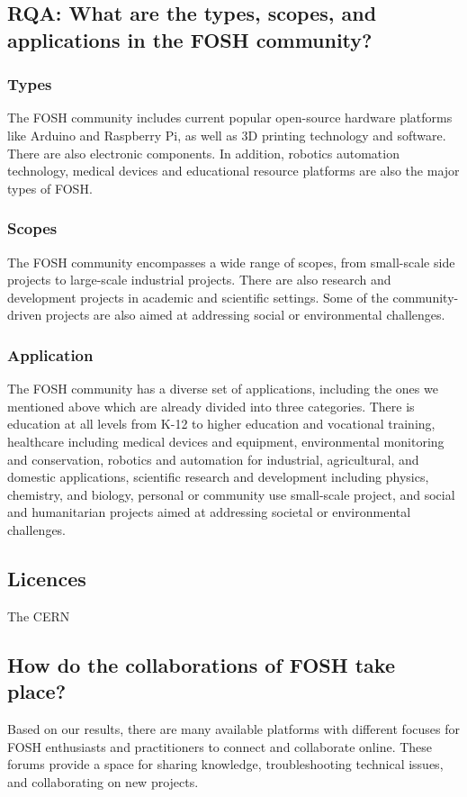\documentclass[final-report.tex]{subfiles}
\begin{document}
\subsection{RQA: What are the types, scopes, and applications in the FOSH community?}

\subsubsection{Types} 
The FOSH community includes current popular open-source hardware platforms like Arduino and Raspberry Pi, as well as 3D printing technology and software. There are also electronic components. In addition, robotics automation technology, medical devices and educational resource platforms are also the major types of FOSH.

\subsubsection{Scopes}
The FOSH community encompasses a wide range of scopes, from small-scale side projects to large-scale industrial projects. There are also research and development projects in academic and scientific settings. Some of the community-driven projects are also aimed at addressing social or environmental challenges.

\subsubsection{Application}
The FOSH community has a diverse set of applications, including the ones we mentioned above which are already divided into three categories. 
There is education at all levels from K-12 to higher education and vocational training, healthcare including medical devices and equipment, environmental monitoring and conservation, robotics and automation for industrial, agricultural, and domestic applications, scientific research and development including physics, chemistry, and biology, personal or community use small-scale project, and social and humanitarian projects aimed at addressing societal or environmental challenges.

\subsection{Licences}
The CERN 

\subsection{How do the collaborations of FOSH take place?}
Based on our results, there are many available platforms with different focuses for FOSH enthusiasts and practitioners to connect and collaborate online. These forums provide a space for sharing knowledge, troubleshooting technical issues, and collaborating on new projects.
\end{document}
